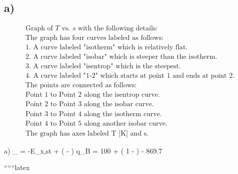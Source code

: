

\subsection*{a)}

\[
\begin{array}{c}
\text{Graph of } T \text{ vs. } s \text{ with the following details:} \\
\text{The graph has four curves labeled as follows:} \\
\text{1. A curve labeled "isotherm" which is relatively flat.} \\
\text{2. A curve labeled "isobar" which is steeper than the isotherm.} \\
\text{3. A curve labeled "isentrop" which is the steepest.} \\
\text{4. A curve labeled "1-2" which starts at point 1 and ends at point 2.} \\
\text{The points are connected as follows:} \\
\text{Point 1 to Point 2 along the isentrop curve.} \\
\text{Point 2 to Point 3 along the isobar curve.} \\
\text{Point 3 to Point 4 along the isotherm curve.} \\
\text{Point 4 to Point 5 along another isobar curve.} \\
\text{The graph has axes labeled T [K] and s.}
\end{array}
\]

a) \quad {}_{} = -E_{x,st} + \left( \gamma -  \right) \cdot q_B = 100 + \left( 1 -  \right)  - 869.7 

``````latex